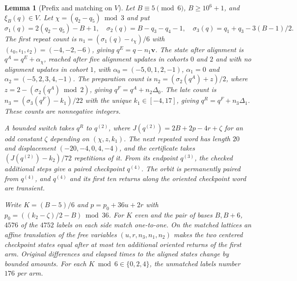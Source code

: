 \documentclass[11pt,reqno]{amsart}
\newtheorem{lemma}[theorem]{Lemma}
\theoremstyle{remark}
\newcommand{\vct}{\boldsymbol v}
\begin{document}
\begin{lemma}[Prefix and matching on \(V\)]\label{lem:box-matching}
Let \(B\equiv5\pmod6\), \(B\ge10^6+1\), and \(\xi_B(q)\in V\). Let \(\chi=(q_2-q_5)\bmod 3\) and put
\[
 \sigma_1(q)=2(q_2-q_5)-B+1,\quad \sigma_2(q)=B-q_3-q_4-1,\quad
 \sigma_3(q)=q_1+q_3-3(B-1)/2.
\]
The first repeat count is \(n_1=(\sigma_1(q)-\iota_\chi)/6\) with \((\iota_0,\iota_1,\iota_2)=(-4,-2,-6)\), giving \(q^E=q-n_1\vct\). The state after alignment is \(q^A=q^E+\alpha_\chi\), reached after five alignment updates in cohorts \(0\) and \(2\) and with no alignment updates in cohort \(1\), with \(\alpha_0=(-5,0,1,2,-1)\), \(\alpha_1=0\) and \(\alpha_2=(-5,2,3,4,-1)\). The preparation count is \(n_2=(\sigma_2(q^A)+z)/2\), where \(z=2-(\sigma_2(q^A)\bmod2)\), giving \(q^F=q^A+n_2\Delta_0\). The late count is \(n_3=(\sigma_3(q^F)-k_1)/22\) with the unique \(k_1\in[-4,17]\), giving \(q^R=q^F+n_3\Delta_1\). These counts are nonnegative integers.

A bounded switch takes \(q^R\) to \(q^{(2)}\), where \(J(q^{(2)})=2B+2p-4r+\zeta\) for an odd constant \(\zeta\) depending on \((\chi,z,k_1)\). The next repeated word has length \(20\) and displacement \((-20,-4,0,4,-4)\), and the certificate takes \((J(q^{(2)})-k_2)/72\) repetitions of it. From its endpoint \(q^{(3)}\), the checked additional steps give a paired checkpoint \(q^{(4)}\). The orbit is permanently paired from \(q^{(4)}\), and \(q^{(4)}\) and its first ten returns along the oriented checkpoint word are transient.

Write \(K=(B-5)/6\) and \(p=p_0+36u+2r\) with \(p_0=((k_2-\zeta)/2-B)\bmod36\). For \(K\) even and the pair of bases \(B,B+6\), \(4576\) of the \(4752\) labels on each side match one-to-one. On the matched lattices an affine translation of the free variables \((u,r,n_3,n_1,n_2)\) makes the two centered checkpoint states equal after at most ten additional oriented returns of the first arm. Original differences and elapsed times to the aligned states change by bounded amounts. For each \(K\bmod6\in\{0,2,4\}\), the unmatched labels number \(176\) per arm.
\end{lemma}
\end{document}
